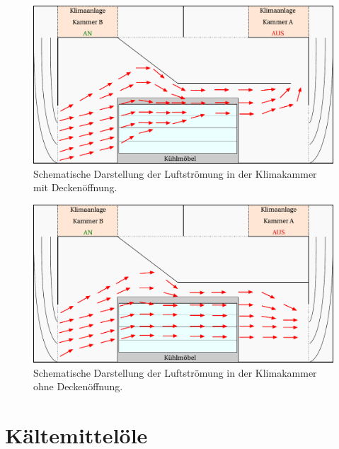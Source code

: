 \begin{figure}[h!tb]
\centering
\includegraphics[scale=.6]{Pictures/ClimateChamber_flow30pctOC.pdf}
\caption{Schematische Darstellung der Luftströmung in der Klimakammer mit Deckenöffnung.}
\label{fig:Klimakammer_offeneDecke}
\end{figure}

\begin{figure}[h!tb]
\centering
\includegraphics[scale=.6]{Pictures/ClimateChamber_flow30pctCC.pdf}
\caption{Schematische Darstellung der Luftströmung in der Klimakammer ohne Deckenöffnung.}
\label{fig:Klimakammer_geschlosseneDecke}
\end{figure}





\clearpage









\section{Kältemittelöle}
\label{sec:EinflussÖl}

